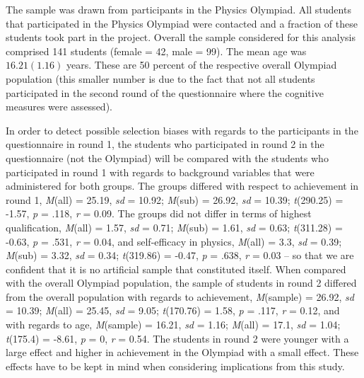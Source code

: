 \documentclass[D:/studies/WinnerS/Erhebungen/IPhO1718/paper/problem_solving/main/TaylorFrancis/interactapasample]{subfiles}
\begin{document}
The sample was drawn from participants in the Physics Olympiad. All students that participated in the Physics Olympiad were contacted and a fraction of these students took part in the project. Overall the sample considered for this analysis comprised 141 students (female = 42, male = 99). The mean age was $16.21 (1.16)$ years. These are 50 percent of the respective overall Olympiad population (this smaller number is due to the fact that not all students participated in the second round of the questionnaire where the cognitive measures were assessed). 

In order to detect possible selection biases with regards to the participants in the questionnaire in round 1, the students who participated in round 2 in the questionnaire (not the Olympiad) will be compared with the students who participated in round 1 with regards to background variables that were administered for both groups. The groups differed with respect to achievement in round 1, \textit{M}(all) = 25.19, \textit{sd} = 10.92; \textit{M}(sub) = 26.92, \textit{sd} = 10.39; \textit{t}(290.25) = -1.57, \textit{p} = .118, \textit{r} = 0.09. The groups did not differ in terms of highest qualification, \textit{M}(all) = 1.57, \textit{sd} = 0.71; \textit{M}(sub) = 1.61, \textit{sd} = 0.63; \textit{t}(311.28) = -0.63, \textit{p} = .531, \textit{r} = 0.04, and self-efficacy in physics, \textit{M}(all) = 3.3, \textit{sd} = 0.39; \textit{M}(sub) = 3.32, \textit{sd} = 0.34; \textit{t}(319.86) = -0.47, \textit{p} = .638, \textit{r} = 0.03 -- so that we are confident that it is no artificial sample that constituted itself. When compared with the overall Olympiad population, the sample of students in round 2 differed from the overall population with regards to achievement, \textit{M}(sample) = 26.92, \textit{sd} = 10.39; \textit{M}(all) = 25.45, \textit{sd} = 9.05; \textit{t}(170.76) = 1.58, \textit{p} = .117, \textit{r} = 0.12, and with regards to age, \textit{M}(sample) = 16.21, \textit{sd} = 1.16; \textit{M}(all) = 17.1, \textit{sd} = 1.04; \textit{t}(175.4) = -8.61, \textit{p} = 0, \textit{r} = 0.54. The students in round 2 were younger with a large effect and higher in achievement in the Olympiad with a small effect. These effects have to be kept in mind when considering implications from this study.
\end{document}
